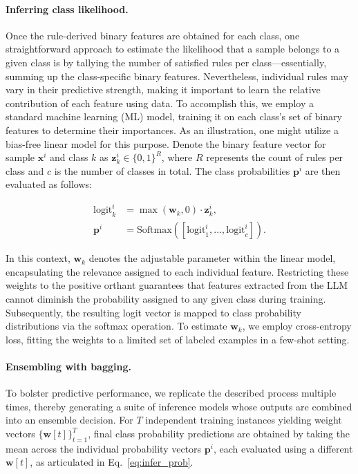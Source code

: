 \paragraph{Inferring class likelihood.} Once the rule-derived binary features are obtained for each class, one straightforward approach to estimate the likelihood that a sample belongs to a given class is by tallying the number of satisfied rules per class—essentially, summing up the class-specific binary features. Nevertheless, individual rules may vary in their predictive strength, making it important to learn the relative contribution of each feature using data. To accomplish this, we employ a standard machine learning (ML) model, training it on each class’s set of binary features to determine their importances. As an illustration, one might utilize a bias-free linear model for this purpose. Denote the binary feature vector for sample $\mathbf{x}^i$ and class $k$ as $\mathbf{z}_k^i \in \{0, 1\}^R$, where $R$ represents the count of rules per class and $c$ is the number of classes in total. The class probabilities $\mathbf{p}^i$ are then evaluated as follows:

\begin{align}
\text{logit}_k^i &= \max(\mathbf{w}_k, 0) \cdot \mathbf{z}_k^i, \nonumber \\
\mathbf{p}^i &= \text{Softmax}({[\text{logit}_{1}^i, ..., \text{logit}_{c}^i]}). \label{eq:infer_prob}
\end{align}

In this context, $\mathbf{w}_k$ denotes the adjustable parameter within the linear model, encapsulating the relevance assigned to each individual feature. Restricting these weights to the positive orthant guarantees that features extracted from the LLM cannot diminish the probability assigned to any given class during training. Subsequently, the resulting logit vector is mapped to class probability distributions via the softmax operation. To estimate $\mathbf{w}_k$, we employ cross-entropy loss, fitting the weights to a limited set of labeled examples in a few-shot setting.

\vspace*{-0.12in}
\paragraph{Ensembling with bagging.} To bolster predictive performance, we replicate the described process multiple times, thereby generating a suite of inference models whose outputs are combined into an ensemble decision. For $T$ independent training instances yielding weight vectors $\{\mathbf{w}[t]\}_{t=1}^T$, final class probability predictions are obtained by taking the mean across the individual probability vectors $\mathbf{p}^i$, each evaluated using a different $\mathbf{w}[t]$, as articulated in Eq.~\ref{eq:infer_prob}.


